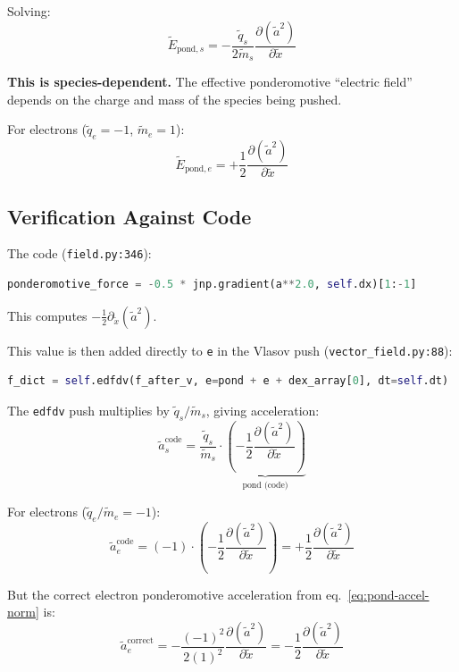 \documentclass[11pt]{article}
\newcommand{\tl}[1]{\tilde{#1}}
\newcommand{\code}[1]{\texttt{#1}}
\newcommand{\tq}{\tl{q}}
\newcommand{\tm}{\tl{m}}
\begin{document}
Solving:
\begin{equation}
    \boxed{
    \tl{E}_{\text{pond},s} = -\frac{\tq_s}{2\tm_s} \frac{\partial(\tl{a}^2)}{\partial \tl{x}}
    }
    \label{eq:pond-Efield}
\end{equation}

\textbf{This is species-dependent.} The effective ponderomotive ``electric field'' depends on the charge and mass of the species being pushed.

For electrons ($\tq_e = -1$, $\tm_e = 1$):
\begin{equation}
    \tl{E}_{\text{pond},e} = +\frac{1}{2} \frac{\partial(\tl{a}^2)}{\partial \tl{x}}
\end{equation}

\subsection{Verification Against Code}
\label{sec:pond-code}

The code (\code{field.py:346}):
\begin{lstlisting}[language=Python]
ponderomotive_force = -0.5 * jnp.gradient(a**2.0, self.dx)[1:-1]
\end{lstlisting}

This computes $-\frac{1}{2}\partial_{\tl{x}}(\tl{a}^2)$.

This value is then added directly to \code{e} in the Vlasov push (\code{vector\_field.py:88}):
\begin{lstlisting}[language=Python]
f_dict = self.edfdv(f_after_v, e=pond + e + dex_array[0], dt=self.dt)
\end{lstlisting}

The \code{edfdv} push multiplies by $\tq_s/\tm_s$, giving acceleration:
\begin{equation}
    \tl{a}_s^{\text{code}} = \frac{\tq_s}{\tm_s} \cdot \underbrace{\left(-\frac{1}{2}\frac{\partial(\tl{a}^2)}{\partial \tl{x}}\right)}_{\text{pond (code)}}
\end{equation}

For electrons ($\tq_e/\tm_e = -1$):
\begin{equation}
    \tl{a}_e^{\text{code}} = (-1) \cdot \left(-\frac{1}{2}\frac{\partial(\tl{a}^2)}{\partial \tl{x}}\right)
    = +\frac{1}{2}\frac{\partial(\tl{a}^2)}{\partial \tl{x}}
\end{equation}

But the correct electron ponderomotive acceleration from eq.~\eqref{eq:pond-accel-norm} is:
\begin{equation}
    \tl{a}_e^{\text{correct}} = -\frac{(-1)^2}{2(1)^2}\frac{\partial(\tl{a}^2)}{\partial \tl{x}}
    = -\frac{1}{2}\frac{\partial(\tl{a}^2)}{\partial \tl{x}}
\end{equation}
\end{document}
